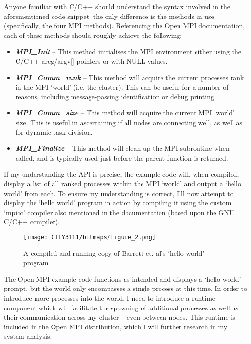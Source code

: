 Anyone familiar with C/C++ should understand the syntax involved in the aforementioned code snippet, the only difference is the methods in use (specifically, the four MPI methods). Referencing the Open MPI documentation, each of these methods should roughly achieve the following:

\begin{itemize}
    \item \textbf{\emph{MPI\_Init}} -- This method initialises the MPI environment either using the C/C++ arcg/argv[] pointers or with NULL values.
    \item \textbf{\emph{MPI\_Comm\_rank}} -- This method will acquire the current processes rank in the MPI `world' (i.e. the cluster). This can be useful for a number of reasons, including message-passing identification or debug printing.
    \item \textbf{\emph{MPI\_Comm\_size}} -- This method will acquire the current MPI `world' size. This is useful in ascertaining if all nodes are connecting well, as well as for dynamic task division.
    \item \textbf{\emph{MPI\_Finalize}} -- This method will clean up the MPI subroutine when called, and is typically used just before the parent function is returned.
\end{itemize}

If my understanding the API is precise, the example code will, when compiled, display a list of all ranked processes within the MPI `world' and output a `hello world' from each. To ensure my understanding is correct, I'll now attempt to display the `hello world' program in action by compiling it using the custom `mpicc' compiler also mentioned in the documentation (based upon the GNU C/C++ compiler).

\begin{figure}[H]
    \texttt{[image: CITY3111/bitmaps/figure\_2.png]}
    \caption{A compiled and running copy of Barrett et. al's `hello world' program \cite{barrett_et_al_2006}}
    \label{figure_2}
\end{figure}

The Open MPI example code functions as intended and displays a `hello world' prompt, but the world only encompasses a single process at this time. In order to introduce more processes into the world, I need to introduce a runtime component which will facilitate the spawning of additional processes as well as their communication across my cluster -- even between nodes. This runtime is included in the Open MPI distribution, which I will further research in my system analysis.

